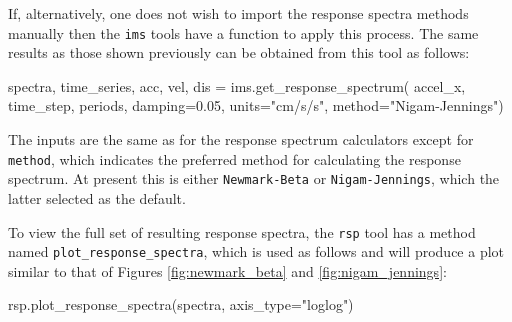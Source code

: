 If, alternatively, one does not wish to import the response spectra methods manually then the \verb=ims= tools have a function to apply this process. The same results as those shown previously can be obtained from this tool as follows:

\begin{python}
spectra, time_series, acc, vel, dis = ims.get_response_spectrum(
    accel_x,
    time_step,
    periods,
    damping=0.05,
    units="cm/s/s",
    method="Nigam-Jennings") 
\end{python}

The inputs are the same as for the response spectrum calculators except for \verb=method=, which indicates the preferred method for calculating the response spectrum. At present this is either \verb=Newmark-Beta= or \verb=Nigam-Jennings=, which the latter selected as the default.

To view the full set of resulting response spectra, the \verb=rsp= tool has a method named \verb=plot_response_spectra=, which is used as follows and will produce a plot similar to that of Figures \ref{fig:newmark_beta} and \ref{fig:nigam_jennings}:

\begin{python}
rsp.plot_response_spectra(spectra,
                          axis_type="loglog")
\end{python}

